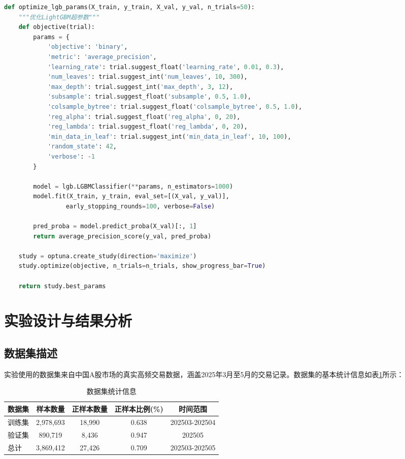 \documentclass[12pt,a4paper]{article}
\begin{document}
\begin{lstlisting}[language=Python, caption=超参数优化实现]
def optimize_lgb_params(X_train, y_train, X_val, y_val, n_trials=50):
    """优化LightGBM超参数"""
    def objective(trial):
        params = {
            'objective': 'binary',
            'metric': 'average_precision',
            'learning_rate': trial.suggest_float('learning_rate', 0.01, 0.3),
            'num_leaves': trial.suggest_int('num_leaves', 10, 300),
            'max_depth': trial.suggest_int('max_depth', 3, 12),
            'subsample': trial.suggest_float('subsample', 0.5, 1.0),
            'colsample_bytree': trial.suggest_float('colsample_bytree', 0.5, 1.0),
            'reg_alpha': trial.suggest_float('reg_alpha', 0, 20),
            'reg_lambda': trial.suggest_float('reg_lambda', 0, 20),
            'min_data_in_leaf': trial.suggest_int('min_data_in_leaf', 10, 100),
            'random_state': 42,
            'verbose': -1
        }
        
        model = lgb.LGBMClassifier(**params, n_estimators=1000)
        model.fit(X_train, y_train, eval_set=[(X_val, y_val)], 
                 early_stopping_rounds=100, verbose=False)
        
        pred_proba = model.predict_proba(X_val)[:, 1]
        return average_precision_score(y_val, pred_proba)
    
    study = optuna.create_study(direction='maximize')
    study.optimize(objective, n_trials=n_trials, show_progress_bar=True)
    
    return study.best_params
\end{lstlisting}

\section{实验设计与结果分析}

\subsection{数据集描述}

实验使用的数据集来自中国A股市场的真实高频交易数据，涵盖2025年3月至5月的交易记录。数据集的基本统计信息如表\ref{tab:dataset_stats}所示：

\begin{table}[H]
\centering
\caption{数据集统计信息}
\label{tab:dataset_stats}
\begin{tabular}{lcccc}
\toprule
数据集 & 样本数量 & 正样本数量 & 正样本比例(\%) & 时间范围 \\
\midrule
训练集 & 2,978,693 & 18,990 & 0.638 & 202503-202504 \\
验证集 & 890,719 & 8,436 & 0.947 & 202505 \\
总计 & 3,869,412 & 27,426 & 0.709 & 202503-202505 \\
\bottomrule
\end{tabular}
\end{table}
\end{document}
